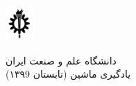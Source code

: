 \begin{minipage}{0.1\textwidth}%
\includegraphics[width=1.1cm]{images/iust_logo.png}
\end{minipage}%
\hfill%
\begin{minipage}{0.9\textwidth}\raggedleft
دانشگاه علم و صنعت ایران\\
یادگیری ماشین (تابستان ۱۳۹9)\\
\end{minipage}

\makepertitle